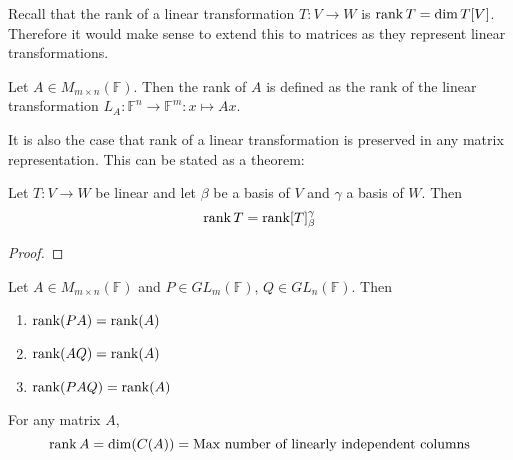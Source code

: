 \documentclass[../notes.tex]{subfiles}
\begin{document}
Recall that the rank of a linear transformation $T : V \to W$ is $\rank T = \dim T[V]$. Therefore it would make sense to extend this to matrices as they represent linear transformations.

\begin{definition}
    Let $A \in M_{m \times n}(\mathbb{F})$. Then the rank of $A$ is defined as the rank of the linear transformation $L_A : \mathbb{F}^n \to \mathbb{F}^m : x \mapsto Ax$.
\end{definition}

It is also the case that rank of a linear transformation is preserved in any matrix representation. This can be stated as a theorem:

\begin{theorem}
    \label{thm:linearrankpreservation}
    Let $T: V \to W$ be linear and let $\beta$ be a basis of $V$ and $\gamma$ a basis of $W$. Then
    \[
        \rank T = \rank [T]_{\beta}^\gamma
    \]
\end{theorem}
\begin{proof}
\end{proof}

\begin{theorem}
    Let $A \in M_{m\times n}(\mathbb{F})$ and $P \in GL_m(\mathbb{F})$, $Q \in GL_n(\mathbb{F})$. Then
    \begin{enumerate}
        \item $\rank(PA) = \rank(A)$
        \item $\rank(AQ) = \rank(A)$
        \item $\rank(PAQ) = \rank(A)$
    \end{enumerate}
\end{theorem}

\begin{theorem}
    \label{thm:columnsequalrank}
    For any matrix $A$,
    \[
        \rank A = \dim(C(A)) = \text{Max number of linearly independent columns}
    \]
\end{theorem}
\end{document}
